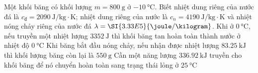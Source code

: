 \begin{ex}
	Một khối băng có khối lượng $m =\SI{800}{\gram}$ ở $\SI{-10}{\celsius}$. Biết nhiệt dung riêng của nước đá là $c_{\text{đ}}= \SI{2090}{\joule/\kilogram\cdot\kelvin}$; nhiệt dung riêng của nước là $c_n =\SI{4190}{\joule/\kilogram\cdot\kelvin}$ và nhiệt nóng chảy riêng của nước đá $\lambda=\SI{3.33E5}{\joule/\kilogram}$.
	{Khi ở  $\SI{0}{\celsius}$, nếu truyền một nhiệt lượng $\SI{3352}{\joule}$ thì khối băng tan hoàn toàn thành nước ở nhiệt độ $\SI{0}{\celsius}$}
	{\True Khi băng bắt đầu nóng chảy, nếu nhận được nhiệt lượng $\SI{83.25}{\kilo\joule}$ thì khối lượng băng còn lại là $\SI{550}{\gram}$}
	{\True Cần một năng lượng $\SI{336.92}{\kilo\joule}$ truyền cho khối băng để nó chuyển hoàn toàn sang trạng thái lỏng ở $\SI{25}{\celsius}$}
\end{ex}
